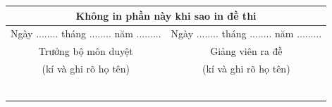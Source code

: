 \documentclass[13pt]{article}
\begin{document}
\vskip 4cm
\begin{center}
\begin{tabular}{ |c|c|}
 \hline
 \multicolumn{2}{|c|}{{\bf Không in phần này khi sao in đề thi}}\\
 \hline
 Ngày ........ tháng ........ năm ......... &Ngày ........ tháng ........ năm ......... \\
 Trưởng bộ môn duyệt&Giảng viên ra đề  \\
(kí và ghi rõ họ tên)&(kí và ghi rõ họ tên) \\
& \\
& \\
& \\
& \\
& \\
& \\
 \hline
\end{tabular}
\end{center}
\end{document}
